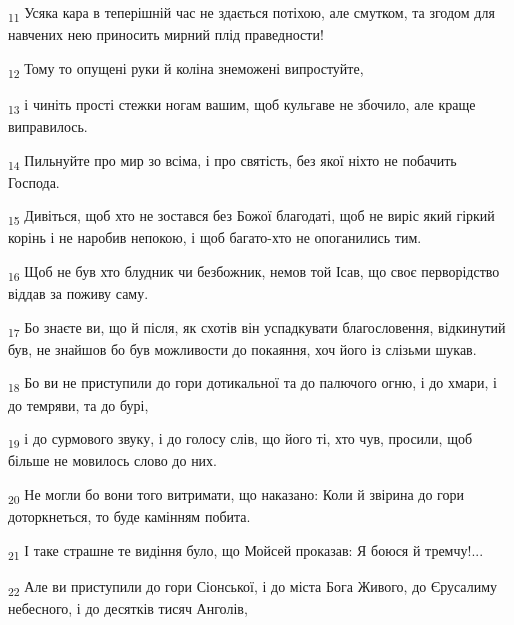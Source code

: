\begin{tcolorbox}
\textsubscript{11} Усяка кара в теперішній час не здається потіхою, але смутком, та згодом для навчених нею приносить мирний плід праведности!
\end{tcolorbox}
\begin{tcolorbox}
\textsubscript{12} Тому то опущені руки й коліна знеможені випростуйте,
\end{tcolorbox}
\begin{tcolorbox}
\textsubscript{13} і чиніть прості стежки ногам вашим, щоб кульгаве не збочило, але краще виправилось.
\end{tcolorbox}
\begin{tcolorbox}
\textsubscript{14} Пильнуйте про мир зо всіма, і про святість, без якої ніхто не побачить Господа.
\end{tcolorbox}
\begin{tcolorbox}
\textsubscript{15} Дивіться, щоб хто не зостався без Божої благодаті, щоб не виріс який гіркий корінь і не наробив непокою, і щоб багато-хто не опоганились тим.
\end{tcolorbox}
\begin{tcolorbox}
\textsubscript{16} Щоб не був хто блудник чи безбожник, немов той Ісав, що своє перворідство віддав за поживу саму.
\end{tcolorbox}
\begin{tcolorbox}
\textsubscript{17} Бо знаєте ви, що й після, як схотів він успадкувати благословення, відкинутий був, не знайшов бо був можливости до покаяння, хоч його із слізьми шукав.
\end{tcolorbox}
\begin{tcolorbox}
\textsubscript{18} Бо ви не приступили до гори дотикальної та до палючого огню, і до хмари, і до темряви, та до бурі,
\end{tcolorbox}
\begin{tcolorbox}
\textsubscript{19} і до сурмового звуку, і до голосу слів, що його ті, хто чув, просили, щоб більше не мовилось слово до них.
\end{tcolorbox}
\begin{tcolorbox}
\textsubscript{20} Не могли бо вони того витримати, що наказано: Коли й звірина до гори доторкнеться, то буде камінням побита.
\end{tcolorbox}
\begin{tcolorbox}
\textsubscript{21} І таке страшне те видіння було, що Мойсей проказав: Я боюся й тремчу!...
\end{tcolorbox}
\begin{tcolorbox}
\textsubscript{22} Але ви приступили до гори Сіонської, і до міста Бога Живого, до Єрусалиму небесного, і до десятків тисяч Анголів,
\end{tcolorbox}
